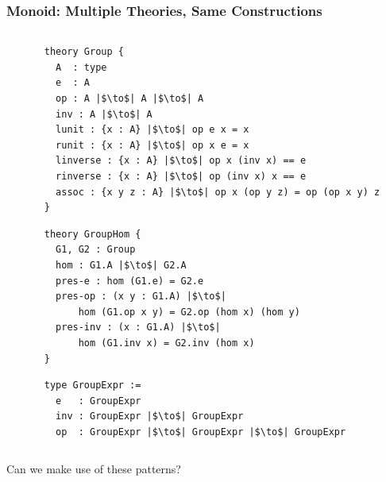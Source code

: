 \documentclass[t,10pt,numbers,fleqn,usenames,xcolor=dvipsnames]{beamer}
\begin{document}
\begin{frame}[fragile]
\frametitle{Monoid: Multiple Theories, Same Constructions}
\begin{columns}
    \begin{column}{0.45\textwidth}

\vspace{0.65cm}

\vspace{0.35cm}          

     \end{column} 
     \begin{column}{0.45\textwidth}
     
        \begin{verbatim}
theory Group {
  A  : type 
  e  : A
  op : A |$\to$| A |$\to$| A
  inv : A |$\to$| A
  lunit : {x : A} |$\to$| op e x = x
  runit : {x : A} |$\to$| op x e = x
  linverse : {x : A} |$\to$| op x (inv x) == e
  rinverse : {x : A} |$\to$| op (inv x) x == e
  assoc : {x y z : A} |$\to$| op x (op y z) = op (op x y) z 
}
        \end{verbatim}     
\begin{verbatim}  
theory GroupHom { 
  G1, G2 : Group 
  hom : G1.A |$\to$| G2.A
  pres-e : hom (G1.e) = G2.e
  pres-op : (x y : G1.A) |$\to$| 
      hom (G1.op x y) = G2.op (hom x) (hom y)
  pres-inv : (x : G1.A) |$\to$| 
      hom (G1.inv x) = G2.inv (hom x)  
}
\end{verbatim}  
\begin{verbatim}  
type GroupExpr := 
  e   : GroupExpr 
  inv : GroupExpr |$\to$| GroupExpr
  op  : GroupExpr |$\to$| GroupExpr |$\to$| GroupExpr
\end{verbatim}           
\end{column}
\end{columns} 
\pause
Can we make use of these patterns? 
\end{frame}
\end{document}
